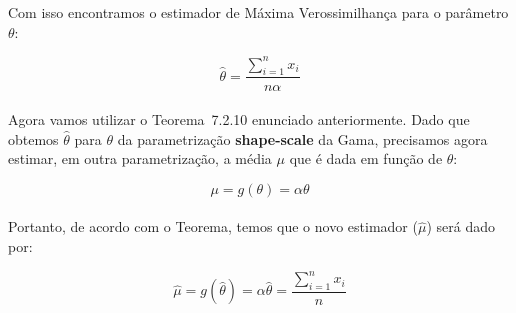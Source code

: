 
Com isso encontramos o estimador de Máxima Verossimilhança para o parâmetro $\theta$:

\begin{equation}
 \widehat{\theta} = \frac{\sum_{i=1}^{n}x_i}{n\alpha} 
\end{equation}\\

Agora vamos utilizar o Teorema~7.2.10 enunciado anteriormente. Dado que obtemos $\widehat{\theta}$ para $\theta$ da parametrização \textbf{shape-scale} da Gama, precisamos agora estimar, em outra parametrização, a média $\mu$ que é dada em função de $\theta$:

\begin{equation}
\mu = g(\theta) = \alpha\theta
\end{equation}\\

Portanto, de acordo com o Teorema, temos que o novo estimador ($\widehat{\mu}$) será dado por:

\begin{equation}
\widehat{\mu} = g(\widehat{\theta}) = \alpha\widehat{\theta}=  \frac{\sum_{i=1}^{n}x_i}{n}
\end{equation}





